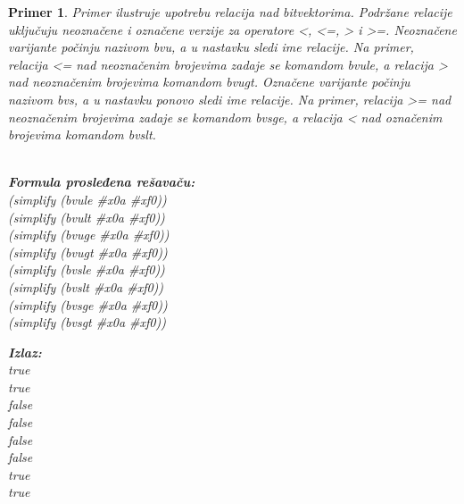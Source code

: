 \documentclass[12pt,oneside]{memoir}
\newtheorem{primer}{Primer}
\begin{document}
\begin{primer} Primer ilustruje upotrebu relacija nad bitvektorima. Podržane relacije uključuju neoznačene i označene verzije za operatore <, <=, > i >=. Neoznačene varijante počinju nazivom bvu, a u nastavku sledi ime relacije. Na primer, relacija <= nad neoznačenim brojevima zadaje se komandom bvule, a relacija > nad neoznačenim brojevima komandom bvugt. Označene varijante počinju nazivom bvs, a u nastavku ponovo sledi ime relacije. Na primer, relacija >= nad neoznačenim brojevima zadaje se komandom bvsge, a relacija < nad označenim brojevima komandom bvslt.
\\ \\ 
\begin{minipage}[b]{0.5\textwidth}
\textbf{Formula prosleđena rešavaču:}
\\(simplify (bvule \#x0a \#xf0))  
\\(simplify (bvult \#x0a \#xf0))  
\\(simplify (bvuge \#x0a \#xf0))  
\\(simplify (bvugt \#x0a \#xf0))  
\\(simplify (bvsle \#x0a \#xf0)) 
\\(simplify (bvslt \#x0a \#xf0))  
\\(simplify (bvsge \#x0a \#xf0))  
\\(simplify (bvsgt \#x0a \#xf0))

\end{minipage}
\hspace{2cm} 
\begin{minipage}[t]{0.5\textwidth}
\vspace{-5.3cm}
\textbf{Izlaz:}
\\true 
\\true 
\\false 
\\false 
\\false 
\\false 
\\true 
\\true
\end{minipage}


\end{primer}
\end{document}
